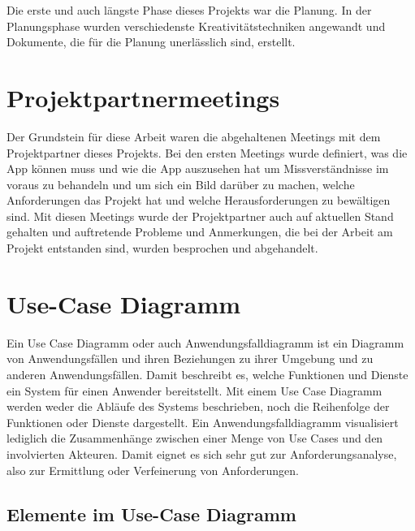 
Die erste und auch längste Phase dieses Projekts war die Planung. 
In der Planungsphase wurden verschiedenste Kreativitätstechniken angewandt und Dokumente, die für die Planung unerlässlich sind, erstellt.

\section{Projektpartnermeetings}

Der Grundstein für diese Arbeit waren die abgehaltenen Meetings mit dem Projektpartner dieses Projekts. Bei den ersten Meetings wurde definiert, was die App können muss und wie die App auszusehen hat
um Missverständnisse im voraus zu behandeln und um sich ein Bild darüber zu machen, welche Anforderungen das Projekt hat und welche Herausforderungen zu bewältigen sind. 
Mit diesen Meetings wurde der Projektpartner auch auf aktuellen Stand gehalten und auftretende Probleme und Anmerkungen, 
die bei der Arbeit am Projekt entstanden sind, wurden besprochen und abgehandelt.

\section{Use-Case Diagramm}

Ein Use Case Diagramm oder auch Anwendungsfalldiagramm ist ein Diagramm von Anwendungsfällen und ihren Beziehungen zu ihrer Umgebung und zu anderen Anwendungsfällen. 
Damit beschreibt es, welche Funktionen und Dienste ein System für einen Anwender bereitstellt.
Mit einem Use Case Diagramm werden weder die Abläufe des Systems beschrieben, 
noch die Reihenfolge der Funktionen oder Dienste dargestellt. 
Ein Anwendungsfalldiagramm visualisiert lediglich die Zusammenhänge zwischen einer Menge von Use Cases und den involvierten Akteuren. Damit eignet es sich sehr gut zur Anforderungsanalyse, also zur Ermittlung oder Verfeinerung von Anforderungen.
\pagebreak
\subsection{Elemente im Use-Case Diagramm}

